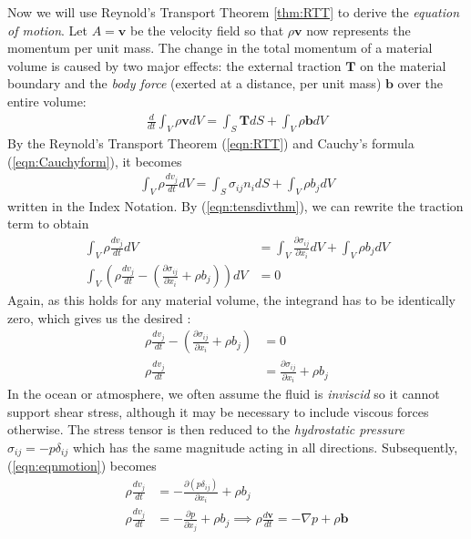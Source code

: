 Now we will use Reynold's Transport Theorem \ref{thm:RTT} to derive the \textit{equation of motion}. Let $A = \textbf{v}$ be the velocity field so that $\rho \textbf{v}$ now represents the momentum per unit mass. The change in the total momentum of a material volume is caused by two major effects: the external traction $\textbf{T}$ on the material boundary and the \textit{body force} (exerted at a distance, per unit mass) $\textbf{b}$ over the entire volume:
\begin{align}
\frac{d}{dt} \int_V \rho \textbf{v} dV = \int_S \textbf{T} dS + \int_V \rho\textbf{b} dV
\end{align}
By the Reynold's Transport Theorem (\ref{eqn:RTT}) and Cauchy's formula (\ref{eqn:Cauchyform}), it becomes
\begin{align}
\int_V \rho \frac{dv_j}{dt} dV = \int_S \sigma_{ij}n_i dS + \int_V \rho b_j dV   
\end{align}
written in the Index Notation. By (\ref{eqn:tensdivthm}), we can rewrite the traction term to obtain
\begin{align}
\int_V \rho \frac{dv_j}{dt} dV &= \int_V \frac{\partial\sigma_{ij}}{\partial x_i} dV + \int_V \rho b_j dV \nonumber \\
\int_V \left(\rho \frac{dv_j}{dt} - \left(\frac{\partial\sigma_{ij}}{\partial x_i}+\rho b_j\right)\right)dV &= 0
\end{align}
Again, as this holds for any material volume, the integrand has to be identically zero, which gives us the desired :
\begin{align}
\rho \frac{dv_j}{dt} - \left(\frac{\partial\sigma_{ij}}{\partial x_i}+\rho b_j\right) &= 0 \nonumber \\
\rho \frac{dv_j}{dt} &= \frac{\partial\sigma_{ij}}{\partial x_i}+\rho b_j \label{eqn:eqnmotion}
\end{align}
In the ocean or atmosphere, we often assume the fluid is \textit{inviscid} so it cannot support shear stress, although it may be necessary to include viscous forces otherwise. The stress tensor is then reduced to the \textit{hydrostatic pressure} $\sigma_{ij} = -p\delta_{ij}$ which has the same magnitude acting in all directions. Subsequently, (\ref{eqn:eqnmotion}) becomes
\begin{align}
\rho \frac{dv_j}{dt} &= -\frac{\partial (p\delta_{ij})}{\partial x_i} + \rho b_j \nonumber \\
\rho \frac{dv_j}{dt} &= -\frac{\partial p}{\partial x_j} + \rho b_j \implies \rho\frac{d\textbf{v}}{dt} = -\nabla p + \rho \textbf{b} \label{eqn:eqnmotion2}
\end{align}
